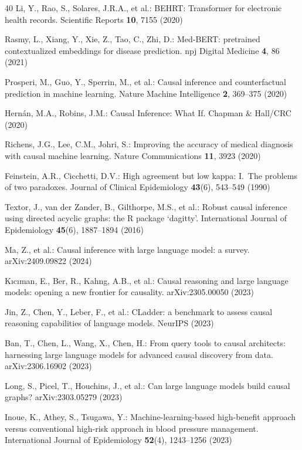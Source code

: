 \documentclass[runningheads]{llncs}
\begin{document}
\begin{thebibliography}{40}
Li, Y., Rao, S., Solares, J.R.A., et al.:
BEHRT: Transformer for electronic health records.
Scientific Reports \textbf{10}, 7155 (2020)

Rasmy, L., Xiang, Y., Xie, Z., Tao, C., Zhi, D.:
Med-BERT: pretrained contextualized embeddings for disease prediction.
npj Digital Medicine \textbf{4}, 86 (2021)

Prosperi, M., Guo, Y., Sperrin, M., et al.:
Causal inference and counterfactual prediction in machine learning.
Nature Machine Intelligence \textbf{2}, 369--375 (2020)

Hern\'{a}n, M.A., Robins, J.M.:
Causal Inference: What If.
Chapman \& Hall/CRC (2020)

Richens, J.G., Lee, C.M., Johri, S.:
Improving the accuracy of medical diagnosis with causal machine learning.
Nature Communications \textbf{11}, 3923 (2020)

Feinstein, A.R., Cicchetti, D.V.:
High agreement but low kappa: I.\ The problems of two paradoxes.
Journal of Clinical Epidemiology \textbf{43}(6), 543--549 (1990)

Textor, J., van der Zander, B., Gilthorpe, M.S., et al.:
Robust causal inference using directed acyclic graphs: the R package `dagitty'.
International Journal of Epidemiology \textbf{45}(6), 1887--1894 (2016)

Ma, Z., et al.:
Causal inference with large language model: a survey.
arXiv:2409.09822 (2024)

K{\i}c{\i}man, E., Ber, R., Kahng, A.B., et al.:
Causal reasoning and large language models: opening a new frontier
for causality.
arXiv:2305.00050 (2023)

Jin, Z., Chen, Y., Leber, F., et al.:
CLadder: a benchmark to assess causal reasoning capabilities of
language models.
NeurIPS (2023)

Ban, T., Chen, L., Wang, X., Chen, H.:
From query tools to causal architects: harnessing large language
models for advanced causal discovery from data.
arXiv:2306.16902 (2023)

Long, S., Picel, T., Houchins, J., et al.:
Can large language models build causal graphs?
arXiv:2303.05279 (2023)

Inoue, K., Athey, S., Tsugawa, Y.:
Machine-learning-based high-benefit approach versus
conventional high-risk approach in blood pressure management.
International Journal of Epidemiology \textbf{52}(4), 1243--1256 (2023)

\end{thebibliography}
\end{document}
